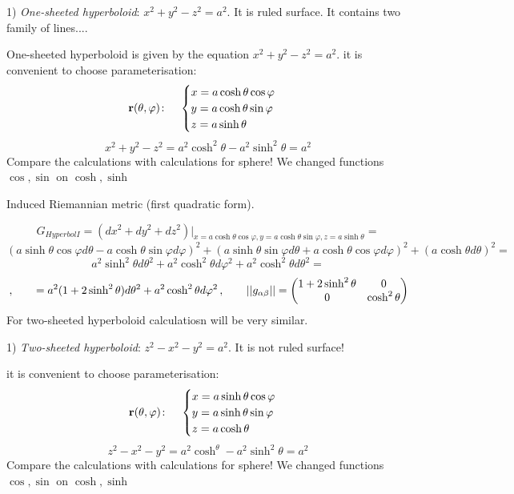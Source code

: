 \documentclass[12pt]{article}
\theoremstyle{theorem}
\numberwithin{equation}{section}
\begin{document}
    1) {\sl One-sheeted hyperboloid}: $x^2+y^2-z^2=a^2$. It is ruled surface. It contains two family of lines....



One-sheeted hyperboloid is given by the equation $x^2+y^2-z^2=a^2$.  it is convenient to
choose parameterisation:
\begin{equation}\label{surfaceonesheeteed}
  {\bf r}(\theta,\varphi)\colon\quad
  \begin{cases}
  x=a\cosh\theta\cos\varphi\\
  y=a\cosh\theta\sin\varphi\\
  z=a\sinh\theta\\
  \end{cases}
\end{equation}
   $$
 x^2+y^2-z^2=a^2\cosh^2\theta-a^2\sinh^2\theta=a^2
   $$
Compare the calculations with calculations for sphere! We changed functions $\cos, \sin$ on $\cosh,\sinh$
\medskip

Induced Riemannian metric (first quadratic form).


              $$
              G_{Hyperbol I}=\left(dx^2+dy^2+dz^2\right)\big\vert_{x=a\cosh\theta\cos\varphi,y=a\cosh\theta\sin\varphi,
              z=a\sinh\theta}=
                      $$
                      $$
                      (a\sinh\theta\cos\varphi d\theta-a\cosh\theta\sin\varphi d\varphi)^2+
                      (a\sinh\theta\sin\varphi d\theta+a\cosh\theta\cos\varphi d\varphi)^2+
                         (a\cosh\theta d\theta)^2=
                      $$
                      $$
          a^2\sinh^2\theta d\theta^2+a^2\cosh^2\theta d\varphi^2+a^2\cosh^2\theta d\theta^2=
                      $$
        \begin{equation}\label{firtsquadraticformforsphere(diff)}\,,\qquad
             =a^2(1+2\sinh^2\theta) d\theta^2+a^2\cosh^2\theta d\varphi^2\,,\qquad
                        ||g_{\alpha\beta}||=
   \begin{pmatrix}
   1+2\sinh^2\theta & 0 \\
   0&  \cosh^2\theta \\
   \end{pmatrix}
                       \end{equation}
 \m
 For two-sheeted hyperboloid calculatiosn will be very similar.

1) {\sl Two-sheeted hyperboloid}: $z^2-x^2-y^2=a^2$. It is not ruled surface!



  it is convenient to
choose parameterisation:
\begin{equation}\label{surfacehyperbol2}
  {\bf r}(\theta,\varphi)\colon\quad
  \begin{cases}
  x=a\sinh\theta\cos\varphi\\
  y=a\sinh\theta\sin\varphi\\
  z=a\cosh\theta\\
  \end{cases}
\end{equation}
   $$
 z^2-x^2-y^2=a^2\cosh^\theta-a^2\sinh^2\theta=a^2
   $$
Compare the calculations with calculations for sphere! We changed functions $\cos, \sin$ on $\cosh,\sinh$
\medskip
\end{document}
